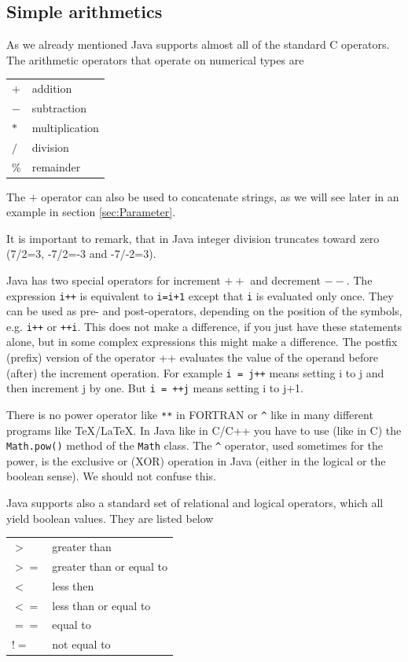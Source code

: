 \subsection{Simple arithmetics}
As we already mentioned Java  supports almost all of the standard
C operators. The arithmetic operators that operate on numerical types
are 
\begin{center}
\begin{tabular}{ll}
$+$ & addition \\
$-$ & subtraction                 \\
$*$ & multiplication \\
$/$ & division \\
\% & remainder
\end{tabular}
\end{center}
The $+$ operator can also be used to concatenate strings, as we will
see later in an example in section \ref{sec:Parameter}.

It is important to remark, that in Java integer division truncates
toward zero (7/2=3, -7/2=-3 and -7/-2=3).

Java has two special operators for increment $++$ and decrement $--$. The 
expression \verb|i++| is equivalent to \verb|i=i+1| except that
\verb|i| is evaluated only once. They can be used as pre- and post-operators,
depending on the position of the symbols, e.g. \verb|i++| or \verb|++i|.
This does not make a difference, if you just have these statements
alone, but in some complex expressions this might make a difference.
The postfix (prefix) version of the operator ++ evaluates  the value
of the operand before (after) the increment operation.
For example \verb|i = j++| means setting i to j and then increment j by one.
But \verb|i = ++j| means setting i to j+1.

There is no power operator like \verb|**| in FORTRAN or \verb|^| like in many
different programs like TeX/LaTeX. In Java like in C/C++ you have to use
(like in C) the \verb|Math.pow()| method of the \verb|Math| class.
The \verb|^| operator, used sometimes for the power, is the exclusive
or (XOR) operation in Java (either in the logical or the boolean sense). 
We should not confuse this. 

Java supports also a standard set of relational and logical operators,
which all yield boolean values. They are listed below

\begin{center}
\begin{tabular}{ll}
$>$  & greater than \\
$>=$ & greater than or equal to \\
$<$  & less then \\
$<=$ & less than or equal to \\
$==$ & equal to \\
$!=$ & not equal to
\end{tabular}
\end{center}



